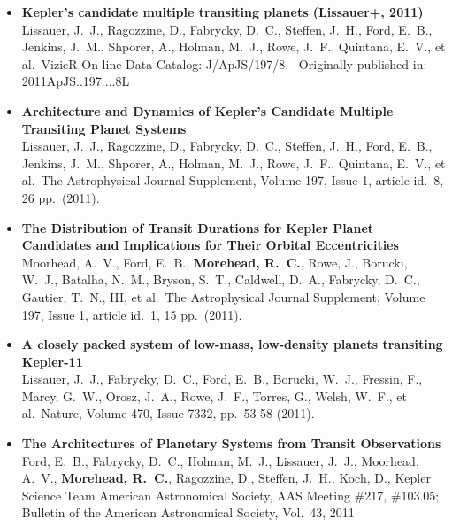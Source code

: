 \documentclass[11pt,letterpaper,sans]{moderncv} %
\begin{document}
\begin{itemize}
 \item \textbf{ Kepler's candidate multiple transiting planets (Lissauer+, 
2011) } \\ Lissauer, J.~J., Ragozzine, D., Fabrycky, D.~C., Steffen, J.~H., 
Ford, E.~B., Jenkins, J.~M., Shporer, A., Holman, M.~J., Rowe, J.~F., 
Quintana, E.~V., et al.\ VizieR On-line Data Catalog: J/ApJS/197/8.~ 
Originally published in: 2011ApJS..197....8L \\ 

 \item \textbf{ Architecture and Dynamics of Kepler's Candidate Multiple 
Transiting Planet Systems } \\ Lissauer, J.~J., Ragozzine, D., Fabrycky, 
D.~C., Steffen, J.~H., Ford, E.~B., Jenkins, J.~M., Shporer, A., Holman, 
M.~J., Rowe, J.~F., Quintana, E.~V., et al.\ The Astrophysical Journal 
Supplement, Volume 197, Issue 1, article id.~8, 26 pp.~(2011).\ \\ 

 \item \textbf{ The Distribution of Transit Durations for Kepler Planet 
Candidates and Implications for Their Orbital Eccentricities } \\ Moorhead, 
A.~V., Ford, E.~B., \textbf{Morehead, R.~C.}, Rowe, J., Borucki, W.~J., Batalha, 
N.~M., Bryson, S.~T., Caldwell, D.~A., Fabrycky, D.~C., Gautier, T.~N., 
III, et al.\ The Astrophysical Journal Supplement, Volume 197, Issue 1, 
article id.~1, 15 pp.~(2011).\ \\ 

 \item \textbf{ A closely packed system of low-mass, low-density planets 
transiting Kepler-11 } \\ Lissauer, J.~J., Fabrycky, D.~C., Ford, E.~B., 
Borucki, W.~J., Fressin, F., Marcy, G.~W., Orosz, J.~A., Rowe, J.~F., 
Torres, G., Welsh, W.~F., et al.\ Nature, Volume 470, Issue 7332, pp.~53-58 
(2011).\ \\ 


 \item \textbf{ The Architectures of Planetary Systems from Transit 
Observations } \\ Ford, E.~B., Fabrycky, D.~C., Holman, M.~J., Lissauer, 
J.~J., Moorhead, A.~V., \textbf{Morehead, R.~C.}, Ragozzine, D., Steffen, J.~H., 
Koch, D., Kepler Science Team American Astronomical Society, AAS Meeting 
\#217, \#103.05; Bulletin of the American Astronomical Society, Vol.~43, 
2011 \\ 


\end{itemize}
\end{document}
